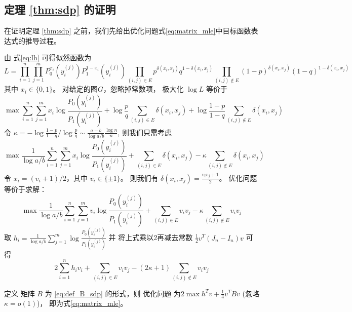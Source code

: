 \subsection{定理 \ref{thm:sdp} 的证明}
\label{sec:thm_sdp_proof}
在证明定理 \ref{thm:sdp}  之前，我们先给出优化问题式\eqref{eq:matrix_mle}中目标函数表达式的推导过程。

由 式\eqref{eq:lh} 可得似然函数为
$$
L=\prod_{i=1}^n \prod_{j=1}^m P_0^{x_i}(y_i^{(j)})P_1^{1-x_i}(y_i^{(j)})
\prod_{(i,j) \in E} p^{\delta(x_i, x_j)}q^{1-\delta(x_i, x_j)}
\prod_{(i,j)\not\in E} (1-p)^{\delta(x_i, x_j)}(1-q)^{1-\delta(x_i, x_j)}
$$
其中 $x_i \in \{0,1\}$。
对给定的图$G$，忽略掉常数项， 极大化 $ \log L$ 等价于
$$
\max \sum_{i=1}^n \sum_{j=1}^m x_i \log \frac{P_0(y_i^{(j)})}{P_1(y_i^{(j)})}
+\log\frac{p}{q}\sum_{(i,j) \in E} \delta(x_i, x_j)
+\log \frac{1-p}{1-q}\sum_{(i,j)\not\in E} \delta(x_i, x_j)
$$
令 $\kappa = -\log\frac{1-p}{1-q} / \log\frac{p}{q} \sim \frac{a-b}{\log a/b}\frac{\log n}{n}$,
则我们只需考虑
$$
\max \frac{1}{\log a/b}\sum_{i=1}^n \sum_{j=1}^m x_i \log \frac{P_0(y_i^{(j)})}{P_1(y_i^{(j)})}
+\sum_{(i,j) \in E} \delta(x_i, x_j)
-\kappa\sum_{(i,j)\not\in E} \delta(x_i, x_j)
$$
令 $x_i = (v_i+1)/2$，其中 $v_i \in \{\pm 1 \}$。
则我们有 $\delta(x_i, x_j) = \frac{v_i v_j + 1}{2}$。
优化问题等价于求解：
$$
\max \frac{1}{\log a/b}\sum_{i=1}^n \sum_{j=1}^m v_i \log \frac{P_0(y_i^{(j)})}{P_1(y_i^{(j)})}
+\sum_{(i,j) \in E} v_i v_j
-\kappa\sum_{(i,j)\not\in E} v_i v_j
$$
取 $h_i = \frac{1}{\log a/b}\sum_{j=1}^m \log \frac{P_0(y_i^{(j)})}{P_1(y_i^{(j)})}$
并
将上式乘以2再减去常数 $\frac{1}{2}v^T(J_n-I_n)v$ 可得
$$
2\sum_{i=1}^n h_iv_i + \sum_{(i,j)\in E} v_i v_j - (2\kappa+1) \sum_{(i,j)\not\in E} v_i v_j
$$

定义 矩阵 $B$ 为 \eqref{eq:def_B_sdp} 的形式，则
优化问题 为$2\max h^T v + \frac{1}{4}v^T B v$ (忽略 $\kappa=o(1)$)，
即为式\eqref{eq:matrix_mle}。

